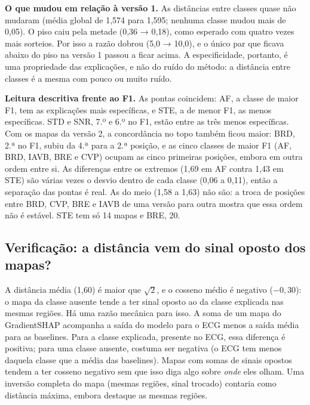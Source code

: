 \documentclass[11pt,a4paper]{article}
\begin{document}
\textbf{O que mudou em relação à versão 1.} As distâncias entre classes quase não mudaram (média global de 1,574 para 1,595; nenhuma classe mudou mais de 0,05). O piso caiu pela metade (0,36 → 0,18), como esperado com quatro vezes mais sorteios. Por isso a razão dobrou (5,0 → 10,0), e o único par que ficava abaixo do piso na versão 1 passou a ficar acima. A especificidade, portanto, é uma propriedade das explicações, e não do ruído do método: a distância entre classes é a mesma com pouco ou muito ruído.

\textbf{Leitura descritiva frente ao F1.} As pontas coincidem: AF, a classe de maior F1, tem as explicações mais específicas, e STE, a de menor F1, as menos específicas. STD e SNR, 7.º e 6.º no F1, estão entre as três menos específicas. Com os mapas da versão 2, a concordância no topo também ficou maior: BRD, 2.ª no F1, subiu da 4.ª para a 2.ª posição, e as cinco classes de maior F1 (AF, BRD, IAVB, BRE e CVP) ocupam as cinco primeiras posições, embora em outra ordem entre si. As diferenças entre os extremos (1,69 em AF contra 1,43 em STE) são várias vezes o desvio dentro de cada classe (0,06 a 0,11), então a separação das pontas é real. As do meio (1,58 a 1,63) não são: a troca de posições entre BRD, CVP, BRE e IAVB de uma versão para outra mostra que essa ordem não é estável. STE tem só 14 mapas e BRE, 20.

\subsection{Verificação: a distância vem do sinal oposto dos mapas?}
A distância média (1,60) é maior que $\sqrt{2}$, e o cosseno médio é negativo ($-0{,}30$): o mapa da classe ausente tende a ter sinal oposto ao da classe explicada nas mesmas regiões. Há uma razão mecânica para isso. A soma de um mapa do GradientSHAP acompanha a saída do modelo para o ECG menos a saída média para as baselines. Para a classe explicada, presente no ECG, essa diferença é positiva; para uma classe ausente, costuma ser negativa (o ECG tem menos daquela classe que a média das baselines). Mapas com somas de sinais opostos tendem a ter cosseno negativo sem que isso diga algo sobre \textit{onde} eles olham. Uma inversão completa do mapa (mesmas regiões, sinal trocado) contaria como distância máxima, embora destaque as mesmas regiões.
\end{document}
